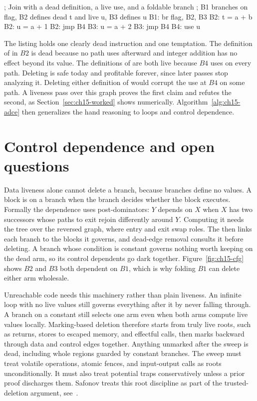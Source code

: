 \begin{irlisting}
; Join with a dead definition, a live use, and a foldable branch
; B1 branches on flag, B2 defines dead t and live u, B3 defines u
B1: br flag, B2, B3
B2: t = a + b
B2: u = a + 1
B2: jmp B4
B3: u = a + 2
B3: jmp B4
B4: use u
\end{irlisting}

The listing holds one clearly dead instruction and one temptation.
The definition of  in $B2$ is dead because no path uses  afterward and integer addition has no effect beyond its value.
The definitions of  are both live because $B4$ uses  on every path.
Deleting  is safe today and profitable forever, since later passes stop analyzing it.
Deleting either definition of  would corrupt the use at $B4$ on some path.
A liveness pass over this graph proves the first claim and refutes the second, as Section~\ref{sec:ch15-worked} shows numerically.
Algorithm~\ref{alg:ch15-adce} then generalizes the hand reasoning to loops and control dependence.
\section{Control dependence and open questions}
\label{sec:ch15-control}

Data liveness alone cannot delete a branch, because branches define no values.
A block is  on a branch when the branch decides whether the block executes.
Formally the dependence uses post-dominators: $Y$ depends on $X$ when $X$ has two successors whose paths to exit rejoin differently around $Y$.
Computing it needs the  tree over the reversed graph, where entry and exit swap roles.
The  then links each branch to the blocks it governs, and dead-edge removal consults it before deleting.
A branch whose condition is constant governs nothing worth keeping on the dead arm, so its control dependents go dark together.
Figure~\ref{fig:ch15-cfg} shows $B2$ and $B3$ both dependent on $B1$, which is why folding $B1$ can delete either arm wholesale.

Unreachable code needs this machinery rather than plain liveness.
An infinite loop with no live values still governs everything after it by never falling through.
A branch on a constant still selects one arm even when both arms compute live values locally.
Marking-based deletion therefore starts from truly live roots, such as returns, stores to escaped memory, and effectful calls, then marks backward through data and control edges together.
Anything unmarked after the sweep is dead, including whole regions guarded by constant branches.
The sweep must treat volatile operations, atomic fences, and input-output calls as roots unconditionally.
It must also treat potential traps conservatively unless a prior proof discharges them.
Safonov treats this root discipline as part of the trusted-deletion argument, see~\cite{safonov-2010-trustworthy}.

